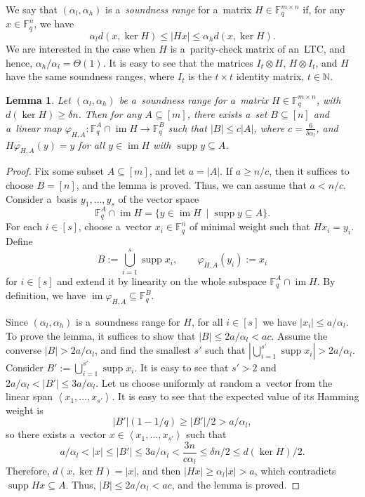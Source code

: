 \documentclass[conference]{IEEEtran}
\newcommand{\abr}[1]{\left\langle#1\right\rangle}
\let\le\leqslant
\let\phi\varphi
\theoremstyle{plain}
\newtheorem{lemma}[theorem]{Lemma}
\theoremstyle{definition}
\theoremstyle{remark}
\newcommand{\NN}{\mathbb{N}}
\newcommand{\abs}[1]{\left\lvert #1 \right\rvert}
\newcommand{\F}{\mathbb{F}}
\DeclareMathOperator{\im}{im}
\DeclareMathOperator{\supp}{supp}
\begin{document}
We say that $(\alpha_l,\alpha_h)$ is a~\emph{soundness range} for a~matrix $H\in \F_q^{m\times n}$ if, for any $x\in \F_q^n$, we have 
\[\alpha_l d(x,\ker H)\le |H x|\le \alpha_h d(x,\ker H).\] 
We are interested in the case when $H$ is a~parity-check matrix of an~LTC, and hence, $\alpha_h/\alpha_l=\Theta(1)$.
It is easy to see that the matrices $I_t\otimes H$, $H\otimes I_t$, and $H$ have the same soundness ranges, where $I_t$ is the $t\times t$ identity matrix, $t\in \NN$.

\begin{lemma}\label{lemma:inv-supp}
Let $(\alpha_l, \alpha_h)$ be a~soundness range for a~matrix $H \in \F_q^{m \times n}$, with $d(\ker H) \geq \delta n$. Then for any $A \subseteq [m]$, there exists a~set $B \subseteq [n]$ and a~linear map $\phi_{H,A}:\F_q^A\cap \im H\to \F_q^B$ such that $|B| \leq c|A|$, where $c = \frac{6}{\delta \alpha_l}$, and $H \phi_{H,A}(y)=y$ for all $y \in \im H$ with $\supp y \subseteq A$.
\end{lemma}


\begin{proof}
Fix some subset $A \subseteq [m]$, and let $a = |A|$. If $a \geq n/c$, then it suffices to choose $B = [n]$, and the lemma is proved. Thus, we can assume that $a < n/c$. Consider a~basis $y_1, \dots, y_s$ of the vector space \[
    \F_q^A\cap \im H=\{y \in  \im H\ \mid \supp y \subseteq A\}.
\] 
For each $i\in [s]$, choose a~vector $x_i \in \F_q^n$ of minimal weight such that $H x_i = y_i$. Define \[
    B := \bigcup_{i=1}^s \supp x_i,\qquad \phi_{H,A}(y_i):=x_i
\]
for $i\in [s]$ and extend it by linearity on the whole subspace $\F_q^A\cap \im H$. By definition, we have $\im \phi_{H,A}\subseteq \F_q^B$.

Since $(\alpha_l, \alpha_h)$ is a~soundness range for $H$, for all $i\in [s]$ we have $\abs{x_i} \le a/\alpha_l$. 
To prove the lemma, it suffices to show that $|B| \leq 2a/\alpha_l < ac$. 
Assume the converse $|B| > 2a/\alpha_l$, and find the smallest $s'$ such that $|\bigcup_{i=1}^{s'} \supp x_i| > 2a/\alpha_l$. 
Consider $B' := \bigcup_{i=1}^{s'} \supp x_i$. It is easy to see that $s' > 2$ and $2a/\alpha_l < |B'| \leq 3a/\alpha_l$. 
Let us choose uniformly at random a~vector from the linear span $\abr{x_1, \dots, x_{s'}}$. 
It is easy to see that the expected value of its Hamming weight is \[
    |B'|(1-1/q) \geq |B'|/2 > a/\alpha_l,
\]
so there exists a~vector $x \in \abr{x_1, \dots, x_{s'}}$ such that 
\[
a/\alpha_l < |x| \leq |B'| \leq 3a/\alpha_l < \frac{3n}{c\alpha_l} \leq \delta n/2 \leq d(\ker H)/2.
\]
Therefore, $d(x, \ker H) = |x|$, and then $|H x| \geq \alpha_l |x| > a$, which contradicts $\supp H x \subseteq A$. Thus, $|B| \leq 2a/\alpha_l < ac$, and the lemma is proved.
\end{proof}
\end{document}
